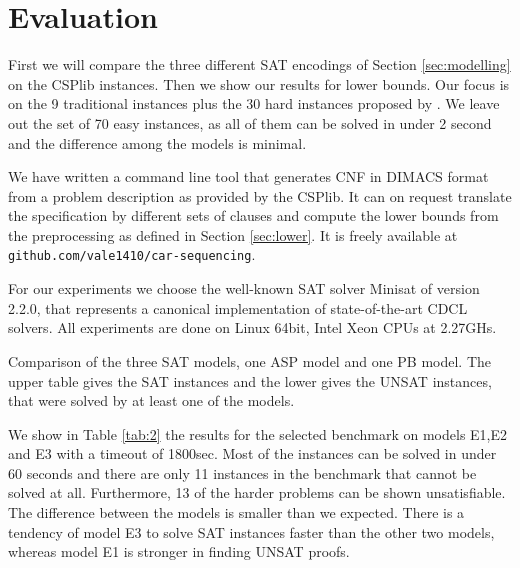 \documentclass[]{llncs}
\begin{document}
\section{Evaluation}
\label{sec:experiments}
                                                                      
First we will compare the three different SAT encodings of Section \ref{sec:modelling} on the CSPlib instances. Then we
show our results for lower bounds. Our focus is on the 9 traditional instances plus the 30 hard instances proposed by
\cite{Gravel05}. We leave out the set of 70 easy instances, as all of them can be solved in under 2 second and the
difference among the models is minimal. 

We have written a command line tool that generates CNF in DIMACS format from a problem description as provided by the
CSPlib. It can on request translate the specification by different sets of clauses and compute the lower bounds from the
preprocessing as defined in Section \ref{sec:lower}. It is freely available at \verb+github.com/vale1410/car-sequencing+.

For our experiments we choose the well-known SAT solver Minisat \cite{Een03} of version 2.2.0, that represents a
canonical implementation of state-of-the-art CDCL solvers. All experiments are done on Linux 64bit, Intel Xeon CPUs at
2.27GHs.

\begin{table}[htbp]
    \caption{Comparison of the three SAT models, one ASP model and one PB model. The upper table gives the SAT instances
    and the lower gives the UNSAT instances, that were solved by at least one of the models. }
    \centering
    
    
    \label{tab:2}
\end{table}

We show in Table \ref{tab:2} the results for the selected benchmark on models E1,E2 and E3 with a timeout of 1800sec.
Most of the instances can be solved in under 60 seconds and there are only 11 instances in the benchmark that cannot be
solved at all. Furthermore, 13 of the harder problems can be shown unsatisfiable. The difference between the models is
smaller than we expected. There is a tendency of model E3 to solve SAT instances faster than the other two models,
whereas model E1 is stronger in finding UNSAT proofs. 
\end{document}
